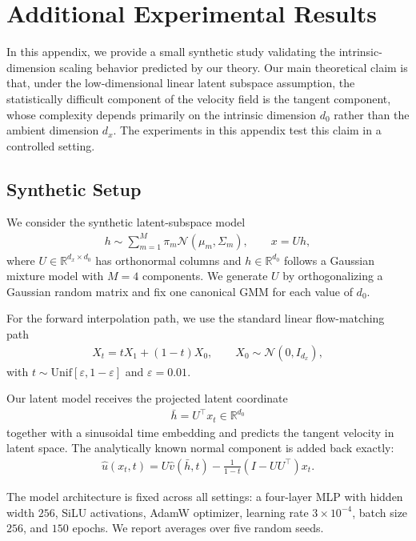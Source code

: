 \section{Additional Experimental Results}
\label{appdx:experimental-results}

In this appendix, we provide a small synthetic study validating the intrinsic-dimension scaling behavior predicted by our theory. Our main theoretical claim is that, under the low-dimensional linear latent subspace assumption, the statistically difficult component of the velocity field is the tangent component, whose complexity depends primarily on the intrinsic dimension $d_0$ rather than the ambient dimension $d_x$. The experiments in this appendix test this claim in a controlled setting.

\subsection{Synthetic Setup}

We consider the synthetic latent-subspace model
\begin{align}
h \sim \sum_{m=1}^M \pi_m \mathcal{N}(\mu_m, \Sigma_m),
\qquad
x = Uh,
\end{align}
where $U \in \mathbb{R}^{d_x \times d_0}$ has orthonormal columns and $h \in \mathbb{R}^{d_0}$ follows a Gaussian mixture model with $M=4$ components. We generate $U$ by orthogonalizing a Gaussian random matrix and fix one canonical GMM for each value of $d_0$.

For the forward interpolation path, we use the standard linear flow-matching path
\begin{align}
X_t = t X_1 + (1-t) X_0,
\qquad
X_0 \sim \mathcal{N}(0, I_{d_x}),
\end{align}
with $t \sim \mathrm{Unif}[\varepsilon, 1-\varepsilon]$ and $\varepsilon = 0.01$.

Our latent model receives the projected latent coordinate
\begin{align}
\bar{h} = U^\top x_t \in \mathbb{R}^{d_0}
\end{align}
together with a sinusoidal time embedding and predicts the tangent velocity in latent space. The analytically known normal component is added back exactly:
\begin{align}
\hat{u}(x_t,t)
=
U \hat{v}(\bar{h}, t)
-
\frac{1}{1-t}(I-UU^\top)x_t.
\end{align}

The model architecture is fixed across all settings: a four-layer MLP with hidden width $256$, SiLU activations, AdamW optimizer, learning rate $3 \times 10^{-4}$, batch size $256$, and $150$ epochs. We report averages over five random seeds.


